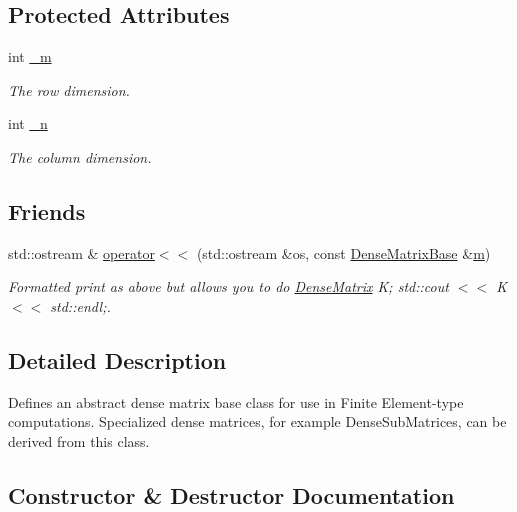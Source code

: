 \subsection*{Protected Attributes}
\begin{DoxyCompactItemize}
\item 
int \mbox{\hyperlink{classfemus_1_1_dense_matrix_base_ae7fb03cbc57d5b8b498456615348d246}{\+\_\+m}}
\begin{DoxyCompactList}\small\item\em The row dimension. \end{DoxyCompactList}\item 
int \mbox{\hyperlink{classfemus_1_1_dense_matrix_base_aebd0d93543ce7468d69e3970b3c1471d}{\+\_\+n}}
\begin{DoxyCompactList}\small\item\em The column dimension. \end{DoxyCompactList}\end{DoxyCompactItemize}
\subsection*{Friends}
\begin{DoxyCompactItemize}
\item 
std\+::ostream \& \mbox{\hyperlink{classfemus_1_1_dense_matrix_base_ad1683d9e1eacee7a0dd4507de51498c6}{operator$<$$<$}} (std\+::ostream \&os, const \mbox{\hyperlink{classfemus_1_1_dense_matrix_base}{Dense\+Matrix\+Base}} \&\mbox{\hyperlink{classfemus_1_1_dense_matrix_base_a67a582a53ab5ce7628a53f6a90fd39b9}{m}})
\begin{DoxyCompactList}\small\item\em Formatted print as above but allows you to do \mbox{\hyperlink{classfemus_1_1_dense_matrix}{Dense\+Matrix}} K; std\+::cout $<$$<$ K $<$$<$ std\+::endl;. \end{DoxyCompactList}\end{DoxyCompactItemize}


\subsection{Detailed Description}
Defines an abstract dense matrix base class for use in Finite Element-\/type computations. Specialized dense matrices, for example Dense\+Sub\+Matrices, can be derived from this class. 

\subsection{Constructor \& Destructor Documentation}
\mbox{\label{classfemus_1_1_dense_matrix_base_a8e75c57265e5e286b794a0bbd48dd356}} 
